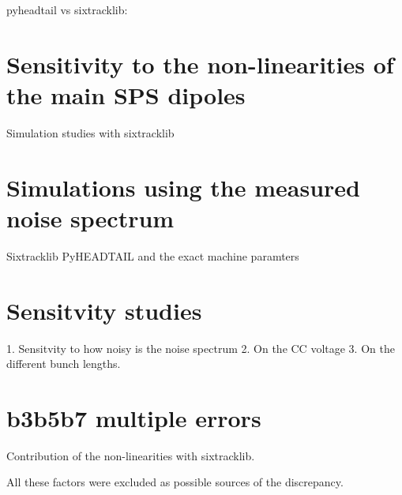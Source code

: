 pyheadtail vs sixtracklib: %

\section{Sensitivity to the non-linearities of the main SPS dipoles}
Simulation studies with sixtracklib

\section{Simulations using the measured noise spectrum}
Sixtracklib PyHEADTAIL and the exact machine paramters

\section{Sensitvity studies}
1. Sensitvity to how noisy is the noise spectrum
2. On the CC voltage
3. On the different bunch lengths. 

\section{b3b5b7 multiple errors}
Contribution of the non-linearities with sixtracklib.


All these factors were excluded as possible sources of the discrepancy.